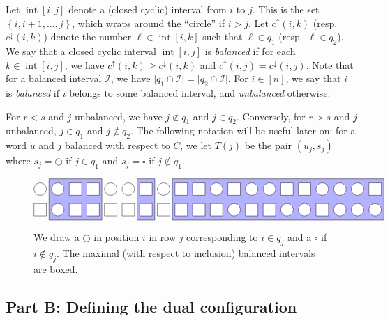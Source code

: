 \documentclass[submission]{FPSAC2018}
\newcommand{\0}{\phantom{c}}
\DeclareMathOperator{\inter}{int} %
\newcommand{\mcI}{\mathcal{I}}
\newcommand{\defn}[1]{{\color{darkred}\emph{#1}}} %
\theoremstyle{plain}
\theoremstyle{definition}
\numberwithin{equation}{section}
\begin{document}
Let $\inter[i,j]$ denote a (closed cyclic) interval from $i$ to $j$. This is the set $\left\{i, i+1, \ldots, j\right\}$, which wraps around the ``circle'' if $i > j$.
Let $c^{\uparrow}(i,k)$ (resp.~$c^{\downarrow}(i,k)$) denote the number $\ell \in \inter[i,k]$ such that $\ell \in q_1$ (resp.~$\ell \in q_2$).
We say that a closed cyclic interval $\inter[i,j]$ is \defn{balanced} if for each $k \in \inter[i,j]$, we have $c^\uparrow(i,k) \geq c^\downarrow(i,k)$ and $c^{\uparrow}(i,j) = c^{\downarrow}(i,j)$.
Note that for a balanced interval $\mcI$, we have $\lvert q_1 \cap \mcI \rvert = \lvert q_2 \cap \mcI \rvert$.
For $i \in [n]$, we say that $i$ is \defn{balanced} if $i$ belongs to some balanced interval, and \defn{unbalanced} otherwise.

For $r < s$ and $j$ unbalanced, we have $j \notin q_1$ and $j \in q_2$.
Conversely, for $r > s$ and $j$ unbalanced, $j \in q_1$ and $j \notin q_2$.
The following notation will be useful later on: for a word $u$ and $j$ balanced with respect to $C$, we let $T(j)$ be the pair $(u_j, s_j)$ where $s_j = \bigcirc$ if $j \in q_1$ and $s_j = \square$ if $j\notin q_1$.

\begin{figure}[t]
\[
\begin{tikzpicture}[scale=0.9]
  \def\sc{0.85}   %
  \def\ll{2}   %
  \def\l{1}   %
  \draw[fill=blue!30] (1.5*\sc,\l-.5) rectangle(4.5*\sc,\ll+.5);
  \draw[fill=blue!30] (6.5*\sc,\l-.5) rectangle(7.5*\sc,\ll+.5);
  \draw[fill=blue!30] (8.5*\sc,\l-.5) rectangle(20.5*\sc,\ll+.5);
  \foreach \i in {1,2,5,6,8,11,13,14,17,18,19} { \draw[fill=white] (\i*\sc,\ll) circle (0.3); }
  \foreach \i in {3,4,7,9,10,12,15,16,20} { \draw[fill=white] (\i*\sc-.3,\ll-.3) rectangle +(0.6,+0.6); }
  \foreach \i in {2,12,15,16,18,19,20} { \draw[fill=white] (\i*\sc,\l) circle (0.3); }
  \foreach \i in {1,3,4,5,6,7,8,9,10,11,13,14,17} { \draw[fill=white] (\i*\sc-.3,\l-.3) rectangle +(0.6,+0.6); }
\end{tikzpicture}
\]
\caption{We draw a $\bigcirc$ in position $i$ in row $j$ corresponding to $i \in q_j$ and a $\square$ if $i \notin q_j$.
The maximal (with respect to inclusion) balanced intervals are boxed.}
\label{fig:balanced}
\end{figure}

\subsection*{Part B: Defining the dual configuration}
\end{document}
